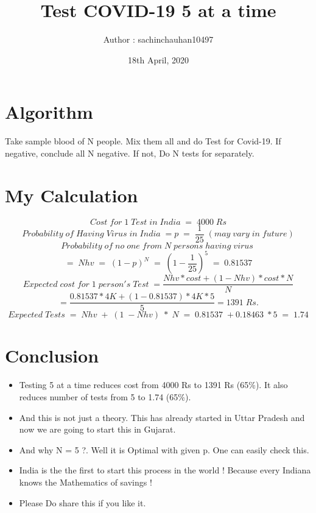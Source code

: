 \documentclass{article}
\title{Test COVID-19 5 at a time}
\author{Author : sachinchauhan10497 }
\date{18th April, 2020}
\begin{document}
\maketitle

\section{Algorithm}
Take sample blood of N people. Mix them all and do Test for Covid-19. If negative, conclude all N negative. If not, Do N tests for separately. 

\section{My Calculation}
\[Cost \; for \; 1\; Test\; in\; India\; = \; 4000 \; Rs\]
\[Probability \;of \;Having \;Virus \;in \;India \;= p \; = \;\frac{1}{25} \; (may \; vary \; in \; future)\]
\[Probability \;of \;no \;one \;from \;N \;persons\;  having\; virus \;\]\[=\;Nhv \;= \; (1 - p)^N \;= \; (1-\frac{1}{25})^5 \;= \;0.81537 \]
\[Expected \;cost \;for \;1 \;person's \;Test \;= \frac{Nhv * cost + (1 - Nhv) * cost * N}{N}\]
\[= \frac{0.81537 * 4K + (1 - 0.81537) * 4K * 5}{5} = 1391 \; Rs.\]
\[Expected \; Tests\; = \; Nhv \; +\; (1\;-Nhv)\;*\;N\;=\;0.81537\;+0.18463\;*5\;=\;1.74\]
\section{Conclusion}\begin{itemize}
\item Testing 5 at a time reduces cost from 4000 Rs to 1391 Rs (65\%). It also reduces number of tests from 5 to 1.74 (65\%). 
\item And this is not just a theory. This has already started in Uttar Pradesh and now we are going to start this in Gujarat.
\item And why N = 5 ?. Well it is Optimal with given p. One can easily check this.
\item India is the the first to start this process in the world !  Because every Indiana knows the Mathematics of savings !
\item Please Do share this if you like it.

\end{itemize}
\end{document}
